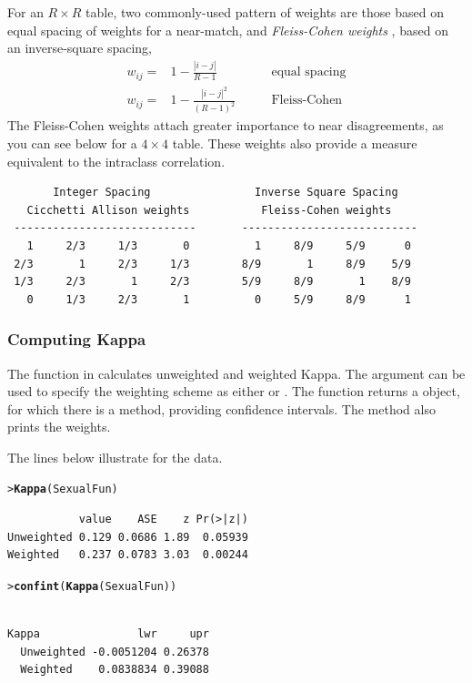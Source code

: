 \documentclass[10pt,krantz2]{krantz}\usepackage[]{graphicx}\usepackage[]{color}
\makeatletter
\newcommand{\hlstd}[1]{\textcolor[rgb]{0.345,0.345,0.345}{#1}}%
\newcommand{\hlkwd}[1]{\textcolor[rgb]{0.737,0.353,0.396}{\textbf{#1}}}%
\newenvironment{kframe}{%
 \def\at@end@of@kframe{}%
 \ifinner\ifhmode%
  \def\at@end@of@kframe{\end{minipage}}%
  \begin{minipage}{\columnwidth}%
 \fi\fi%
 \def\FrameCommand##1{\hskip\@totalleftmargin \hskip-\fboxsep
 \colorbox{shadecolor}{##1}\hskip-\fboxsep
     \hskip-\linewidth \hskip-\@totalleftmargin \hskip\columnwidth}%
 \MakeFramed {\advance\hsize-\width
   \@totalleftmargin\z@ \linewidth\hsize
   \@setminipage}}%
 {\par\unskip\endMakeFramed%
 \at@end@of@kframe}
\newenvironment{knitrout}{}{} %
\renewenvironment{knitrout}{\small\renewcommand{\baselinestretch}{.85}}{} %
\makeatother
\begin{document}
For an $R \times R$ table, two commonly-used pattern of weights are those based on
equal spacing of weights
\citep{CicchettiAllison:71}
for a near-match,
and
\emph{Fleiss-Cohen weights}
\citep{FleissCohen:73}, based on an inverse-square
spacing,
\begin{eqnarray*}
w_{ij} = & 1 - \frac{|i-j|}{R-1} & \quad\quad\mbox{equal spacing} \\
w_{ij} = & 1 - \frac{|i-j|^2}{(R-1)^2} & \quad\quad\mbox{Fleiss-Cohen}
\end{eqnarray*}
The Fleiss-Cohen weights attach greater importance
to near disagreements, as you can see below for a $4 \times 4$ table.
These weights also provide a measure equivalent to the intraclass
correlation.

\begin{verbatim}
       Integer Spacing                Inverse Square Spacing
   Cicchetti Allison weights           Fleiss-Cohen weights
 ----------------------------       ---------------------------
   1     2/3     1/3       0          1     8/9     5/9      0
 2/3       1     2/3     1/3        8/9       1     8/9    5/9
 1/3     2/3       1     2/3        5/9     8/9       1    8/9
   0     1/3     2/3       1          0     5/9     8/9      1
\end{verbatim}

\subsubsection{Computing Kappa}

The function  in  calculates unweighted and weighted
Kappa.  The  argument can be used to specify the weighting
scheme as either  or .
The function returns a  object, for which there
is a  method, providing confidence intervals.
The  method also prints the weights.

The lines below illustrate  for the  data.
\begin{knitrout}
\color{fgcolor}\begin{kframe}
\begin{alltt}
\hlstd{> }\hlkwd{Kappa}\hlstd{(SexualFun)}
\end{alltt}
\begin{verbatim}
           value    ASE    z Pr(>|z|)
Unweighted 0.129 0.0686 1.89  0.05939
Weighted   0.237 0.0783 3.03  0.00244
\end{verbatim}
\begin{alltt}
\hlstd{> }\hlkwd{confint}\hlstd{(}\hlkwd{Kappa}\hlstd{(SexualFun))}
\end{alltt}
\begin{verbatim}
            
Kappa               lwr     upr
  Unweighted -0.0051204 0.26378
  Weighted    0.0838834 0.39088
\end{verbatim}
\end{kframe}
\end{knitrout}
\end{document}
